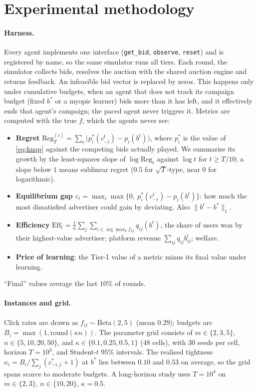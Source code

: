\documentclass[11pt]{article}
\newcommand{\Reg}{\mathrm{Reg}}
\newcommand{\Eff}{\mathrm{Eff}}
\begin{document}
\section{Experimental methodology}\label{sec:method}
\paragraph{Harness.} Every agent implements one interface (\texttt{get\_bid}, \texttt{observe},
\texttt{reset}) and is registered by name, so the same simulator runs all tiers. Each round, the
simulator collects bids, resolves the auction with the shared auction engine and returns feedback. An
infeasible bid vector is replaced by zeros. This happens only under cumulative budgets, when an agent
that does not track its campaign budget (fixed $b^*$ or a myopic learner) bids more than it has left,
and it effectively ends that agent's campaign; the paced agent never triggers it. Metrics are computed with the true
$f$, which the agents never see:
\begin{itemize}
  \item \textbf{Regret} $\Reg^{(i)}_T=\sum_t\big(p_i^*(c^t_{-i})-p_i(b^t)\big)$, where $p_i^*$ is the
        value of \eqref{eq:knap} against the competing bids actually played. We summarise its growth by the
        least-squares slope of $\log\Reg_t$ against $\log t$ for $t\ge T/10$; a slope below $1$ means
        sublinear regret ($0.5$ for $\sqrt T$-type, near $0$ for logarithmic).
  \item \textbf{Equilibrium gap} $\varepsilon_t=\max_i \max\{0,\ p_i^*(c^t_{-i})-p_i(b^t)\}$: how
        much the most dissatisfied advertiser could gain by deviating. Also $\|b^t-b^*\|_1$.
  \item \textbf{Efficiency} $\Eff_t=\frac1n\sum_j\sum_{i\in\arg\max_k f_{kj}}q_{ij}(b^t)$, the share of
        users won by their highest-value advertiser; platform revenue $\sum_{ij}q_{ij}b^t_{ij}$; welfare.
  \item \textbf{Price of learning}: the Tier-1 value of a metric minus its final value under learning.
\end{itemize}
``Final'' values average the last $10\%$ of rounds.

\paragraph{Instances and grid.} Click rates are drawn as $f_{ij}\sim\mathrm{Beta}(2,5)$ (mean $0.29$);
budgets are $B_i=\max(1,\mathrm{round}(\kappa n))$. The parameter grid consists of
$m\in\{2,3,5\}$, $n\in\{5,10,20,50\}$, and $\kappa\in\{0.1,0.25,0.5,1\}$ ($48$ cells), with
$30$ seeds per cell, horizon $T=10^3$, and Student-$t$ $95\%$ intervals. The realised tightness
$\kappa_i=B_i/\sum_j(c^*_{-i,j}+1)$ at $b^*$ lies between $0.10$ and $0.53$ on average, so the grid
spans scarce to moderate budgets. A long-horizon study uses $T=10^4$ on $m\in\{2,3\}$, $n\in\{10,20\}$,
$\kappa=0.5$.
\end{document}
